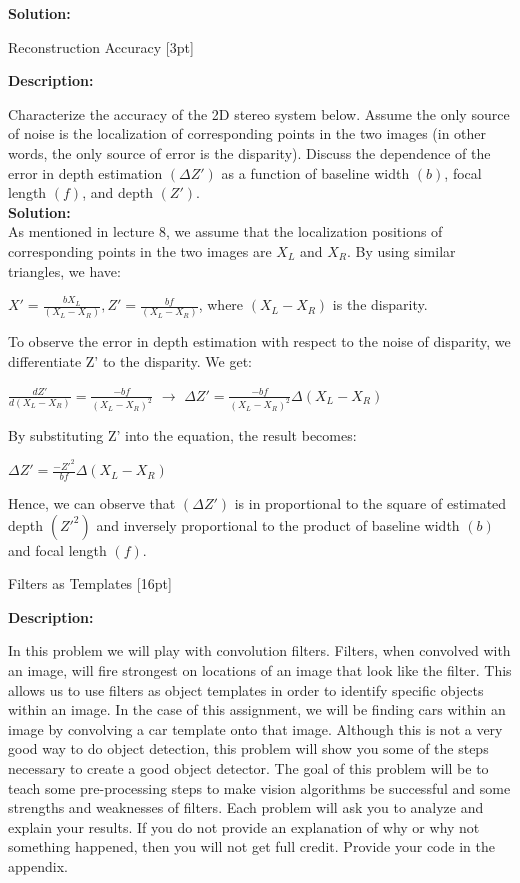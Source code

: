 \documentclass{assignment}
\begin{document}
\begin{problemlist}
\textbf{Solution:}


\newpage
\pbitem Reconstruction Accuracy [3pt]

\textbf{Description:}

Characterize the accuracy of the 2D stereo system below. Assume the only source of noise is the localization of corresponding points in the two images (in other words, the only source of error is the disparity). Discuss the dependence of the error in depth estimation $(\Delta Z')$ as a function of baseline width $(b)$, focal length $(f)$, and depth $(Z')$.\\
\textbf{Solution:}\\
As mentioned in lecture 8, we assume that the localization positions of corresponding points in the two images are $X_L$ and $X_R$. By using similar triangles, we have:\\
\begin{center}
$X' = \frac{bX_L}{(X_L-X_R)}, Z' =  \frac{bf}{(X_L-X_R)}$, where $(X_L-X_R)$ is the disparity.\\
\end{center}
To observe the error in depth estimation with respect to the noise of disparity, we differentiate Z' to the disparity. We get:\\
\begin{center}
$\frac{dZ'}{d(X_L-X_R)} = \frac{-bf}{(X_L-X_R)^2}$ $\to$ $\Delta Z' = \frac{-bf}{(X_L-X_R)^2} \Delta(X_L-X_R)$\\
\end{center}
By substituting Z' into the equation, the result becomes:\\
\begin{center}
$\Delta Z' = \frac{-Z'^2}{bf} \Delta(X_L-X_R)$\\
\end{center}
Hence, we can observe that $(\Delta Z')$ is in proportional to the square of estimated depth $(Z'^2)$ and inversely proportional to the product of baseline width $(b)$ and focal length $(f)$.




\newpage
\pbitem Filters as Templates [16pt]

\textbf{Description:}

In this problem we will play with convolution filters. Filters, when convolved with an image, will fire strongest on locations of an image that look like the filter. This allows us to use filters as object templates in order to identify specific objects within an image. In the case of this assignment, we will be finding cars within an image by convolving a car template onto that image. Although this is not a very good way to do object detection, this problem will show you some of the steps necessary to create a good object detector. The goal of this problem will be to teach some pre-processing steps to make vision algorithms be successful and some strengths and weaknesses of filters. Each problem will ask you to analyze and explain your results. If you do not provide an explanation of why or why not something happened, then you will not get full credit. Provide your code in the appendix.\\


\end{problemlist}
\end{document}

